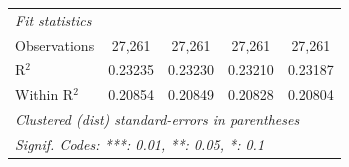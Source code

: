 \begin{tabular}{lcccc}
   \midrule
   \emph{Fit statistics}\\
   Observations                                & 27,261                  & 27,261                 & 27,261                  & 27,261\\  
   R$^2$                                       & 0.23235                 & 0.23230                & 0.23210                 & 0.23187\\  
   Within R$^2$                                & 0.20854                 & 0.20849                & 0.20828                 & 0.20804\\  
   \midrule \midrule
   \multicolumn{5}{l}{\emph{Clustered (dist) standard-errors in parentheses}}\\
   \multicolumn{5}{l}{\emph{Signif. Codes: ***: 0.01, **: 0.05, *: 0.1}}\\
\end{tabular}
\par\endgroup


